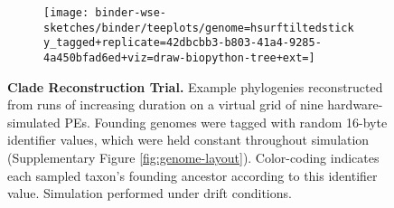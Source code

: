 \begin{figure}
\begin{subfigure}[c]{\linewidth} \centering
  \begin{minipage}[c]{0.08\linewidth} \flushright
    \caption{}
    \label{fig:tagged_250}
  \end{minipage}%
  \begin{minipage}[c]{0.92\linewidth}
    \texttt{[image: binder-wse-sketches/binder/teeplots/genome=hsurftiltedsticky\_tagged+replicate=42dbcbb3-b803-41a4-9285-4a450bfad6ed+viz=draw-biopython-tree+ext=]}
  \end{minipage}%
\end{subfigure}

\vspace{-2ex}

\caption{%
\textbf{Clade Reconstruction Trial.}
\footnotesize
Example phylogenies reconstructed from runs of increasing duration on a virtual grid of nine hardware-simulated PEs.
Founding genomes were tagged with random 16-byte identifier values, which were held constant throughout simulation (Supplementary Figure \ref{fig:genome-layout}).
Color-coding indicates each sampled taxon's founding ancestor according to this identifier value.
Simulation performed under drift conditions.
}
\label{fig:tagged}
\vspace{-0.2in}
\end{figure}
